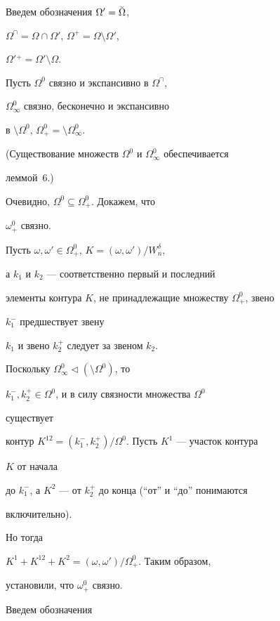 \begin{pf} 


Введем обозначения $\Omega'=\Breve\Omega$, 


$\Omega^\cap=\Omega\cap\Omega'$, $\Omega^+=\Omega\setminus\Omega'$, 


$\Omega'{}^+=\Omega'\setminus\Omega$. 


Пусть $\Omega^0$ связно и экспансивно в $\Omega^\cap$,


$\Omega^0_\infty$ связно, бесконечно и экспансивно 


в $\setminus\Omega^0$, $\Omega^0_+=\setminus\Omega^0_\infty$. 


(Существование множеств $\Omega^0$ и $\Omega^0_\infty$ обеспечивается 


леммой~6.) 


Очевидно, $\Omega^0\subseteq\Omega^0_+$. Докажем, что 


$\omega^0_+$ связно. 


Пусть $\omega,\omega'\in\Omega^0_+$, $K=(\omega,\omega')/W^\delta_n$, 


а $k_1$ и $k_2$ --- соответственно первый и последний 


элементы контура $K$, не принадлежащие множеству $\Omega^0_+$, звено 


$k^-_1$ предшествует звену 


$k_1$ и звено $k^+_2$ следует за звеном $k_2$. 


 


Поскольку $\Omega^0_\infty\vartriangleleft(\setminus\Omega^0)$, то 


$k^-_1,k^+_2\in\Omega^0$, и в силу связности множества $\Omega^0$ 


существует 


контур $K^{12}=(k^-_1,k^+_2)/\Omega^0$. Пусть $K^1$ --- участок контура 


$K$ от начала 


до $k^-_1$, а $K^2$ --- от $k^+_2$ до конца (``от'' и ``до'' понимаются 


включительно). 


Но тогда 


$K^1+K^{12}+K^2=(\omega,\omega')/\Omega^0_+$. Таким образом,


установили, что $\omega^0_+$ связно.





Введем обозначения 


\begin{align*} 



\end{align*}
\end{pf}
